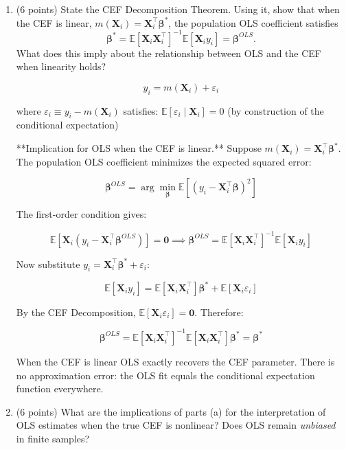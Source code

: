\documentclass[letterpaper,12pt]{article}
\begin{document}
\begin{enumerate}[label=(\alph*)]

\item (6 points) State the CEF Decomposition Theorem. Using it, show that when the CEF is linear, $m(\mathbf{X}_i)=\mathbf{X}_i^\top\boldsymbol{\beta}^*$, the population OLS coefficient satisfies
\[
\boldsymbol{\beta}^* = \mathbb{E}[\mathbf{X}_i\mathbf{X}_i^\top]^{-1}\mathbb{E}[\mathbf{X}_i y_i] = \boldsymbol{\beta}^{OLS}.
\]
What does this imply about the relationship between OLS and the CEF when linearity holds?

$$y_i =m(\mathbf{X}_i) + \varepsilon_i$$

where $\varepsilon_i \equiv y_i - m(\mathbf{X}_i)$ satisfies: $\mathbb{E}[\varepsilon_i \mid \mathbf{X}_i] = 0$ (by construction of the conditional expectation)


**Implication for OLS when the CEF is linear.** Suppose $m(\mathbf{X}_i) = \mathbf{X}_i^\top\boldsymbol{\beta}^*$. The population OLS coefficient minimizes the expected squared error:

$$\boldsymbol{\beta}^{OLS} = \arg\min_{\boldsymbol{\beta}} \mathbb{E}\!\left[(y_i - \mathbf{X}_i^\top\boldsymbol{\beta})^2\right]$$

The first-order condition gives:

$$\mathbb{E}[\mathbf{X}_i(y_i - \mathbf{X}_i^\top\boldsymbol{\beta}^{OLS})] = \mathbf{0} \implies \boldsymbol{\beta}^{OLS} = \mathbb{E}[\mathbf{X}_i\mathbf{X}_i^\top]^{-1}\mathbb{E}[\mathbf{X}_i y_i]$$

Now substitute $y_i = \mathbf{X}_i^\top\boldsymbol{\beta}^* + \varepsilon_i$:

$$\mathbb{E}[\mathbf{X}_i y_i] = \mathbb{E}[\mathbf{X}_i\mathbf{X}_i^\top]\boldsymbol{\beta}^* + \mathbb{E}[\mathbf{X}_i\varepsilon_i]$$

By the CEF Decomposition, $\mathbb{E}[\mathbf{X}_i\varepsilon_i] = \mathbf{0}$. Therefore:

$$\boldsymbol{\beta}^{OLS} = \mathbb{E}[\mathbf{X}_i\mathbf{X}_i^\top]^{-1}\mathbb{E}[\mathbf{X}_i\mathbf{X}_i^\top]\boldsymbol{\beta}^* = \boldsymbol{\beta}^* $$

When the CEF is linear OLS exactly recovers the CEF parameter. There is no approximation error: the OLS fit equals the conditional expectation function everywhere.

\item (6 points) What are the implications of parts (a) for the interpretation of OLS estimates when the true CEF is nonlinear? Does OLS remain \textit{unbiased} in finite samples?


\end{enumerate}
\end{document}
